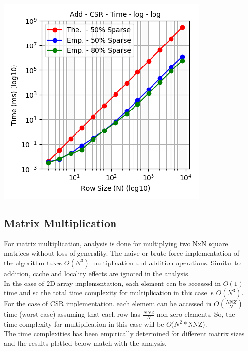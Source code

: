 \documentclass[11pt,a4paper,oneside]{article}
\begin{document}
    \begin{center}
    	\includegraphics[scale=0.6]{4.png}		
    \end{center}
    
    \subsection{Matrix Multiplication}
    For matrix multiplication, analysis is done for multiplying two NxN square matrices without loss of generality. The naive or brute force implementation of the algorithm takes $O(N^3)$ multiplication and addition operations. Similar to addition, cache and locality effects are ignored in the analysis. \\
    \newline
    In the case of 2D array implementation, each element can be accessed in $O(1)$ time and so the total time complexity for multiplication in this case is $O(N^3)$. \\
    \newline
    For the case of CSR implementation, each element can be accessed in $O(\frac{NNZ}{N})$ time (worst case) assuming that each row has $\frac{NNZ}{N}$ non-zero elements. So, the time complexity for multiplication in this case will be $O(N^2*$NNZ). \\   
    \newline    
    The time complexities has been empirically determined for different matrix sizes and the results plotted below match with the analysis,
    
\end{document}
